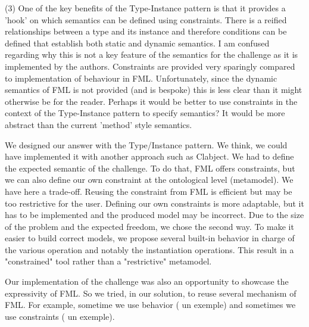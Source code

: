 \documentclass[10pt]{article}
\begin{document}
\begin{response}{(3) One of the key benefits of the Type-Instance pattern is that it provides a 'hook' on which semantics can be defined using constraints. There is a reified relationships between a type and its instance and therefore conditions can be defined that establish both static and dynamic semantics. I am confused regarding why this is not a key feature of the semantics for the challenge as it is implemented by the authors. Constraints are provided very sparingly compared to implementation of behaviour in FML. Unfortunately, since the dynamic semantics of FML is not provided (and is bespoke) this is less clear than it might otherwise be for the reader. Perhaps it would be better to use constraints in the context of the Type-Instance pattern to specify semantics? It would be more abstract than the current 'method' style semantics.}
{\color{red}
We designed our answer with the Type/Instance pattern. We think, we could have implemented it with another approach such as Clabject.
We had to define the expected semantic of the challenge. To do that, FML offers constraints, but we can also define our own constraint at the ontological level (metamodel). We have here a trade-off. Reusing the constraint from FML is efficient but may be too restrictive for the user. Defining our own constraints is more adaptable, but it has to be implemented and the produced model may be incorrect. Due to the size of the problem and the expected freedom, we chose the second way. To make it easier to build correct models, we propose several built-in behavior in charge of the various operation and notably the instantiation operations. This result in a "constrained" tool rather than a "restrictive" metamodel.

Our implementation of the challenge was also an opportunity to showcase the expressivity of FML. So we tried, in our solution, to reuse several mechanism of FML. For example, sometime we use behavior ({\color{teal} un exemple}) and sometimes we use constraints ({\color{teal} un exemple}).}




\end{response}
\end{document}
